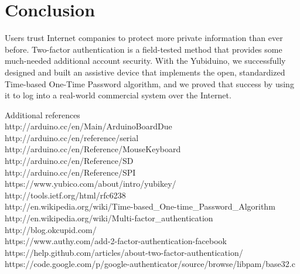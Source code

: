 \documentclass[conference]{IEEEtran}
\begin{document}
\section{Conclusion}
Users trust Internet companies to protect more private information than ever before. Two-factor authentication is a field-tested method that provides some much-needed additional account security. With the Yubiduino, we successfully designed and built an assistive device that implements the open, standardized Time-based One-Time Password algorithm, and we proved that success by using it to log into a real-world commercial system over the Internet.

Additional references \\
http://arduino.cc/en/Main/ArduinoBoardDue \\
http://arduino.cc/en/reference/serial \\
http://arduino.cc/en/Reference/MouseKeyboard \\
http://arduino.cc/en/Reference/SD \\
http://arduino.cc/en/Reference/SPI \\
https://www.yubico.com/about/intro/yubikey/ \\
http://tools.ietf.org/html/rfc6238 \\
http://en.wikipedia.org/wiki/Time-based\_One-time\_Password\_Algorithm \\
http://en.wikipedia.org/wiki/Multi-factor\_authentication \\
http://blog.okcupid.com/ \\
https://www.authy.com/add-2-factor-authentication-facebook \\
https://help.github.com/articles/about-two-factor-authentication/ \\
https://code.google.com/p/google-authenticator/source/browse/libpam/base32.c \\




\end{document}
